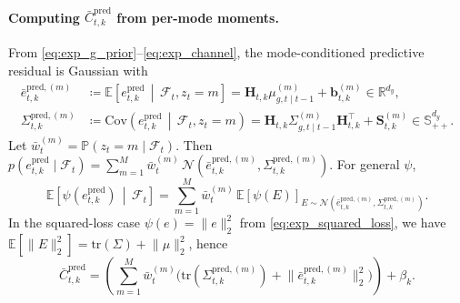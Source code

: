 \paragraph{Computing \(\bar C_{t,k}^{\mathrm{pred}}\) from per-mode moments.}
From \eqref{eq:exp_g_prior}--\eqref{eq:exp_channel}, the mode-conditioned predictive residual is Gaussian with
\begin{align}
\label{eq:exp_residual_mean}
\bar e_{t,k}^{\mathrm{pred},(m)}
&\coloneqq
\mathbb{E}\!\left[e_{t,k}^{\mathrm{pred}}\,\middle|\,\mathcal{F}_t,z_t=m\right]
=
\mathbf{H}_{t,k}\mu^{(m)}_{g,t\mid t-1}+\mathbf{b}^{(m)}_{t,k}\in\mathbb{R}^{d_y},\\
\label{eq:exp_residual_var}
\Sigma_{t,k}^{\mathrm{pred},(m)}
&\coloneqq
\mathrm{Cov}\!\left(e_{t,k}^{\mathrm{pred}}\,\middle|\,\mathcal{F}_t,z_t=m\right)
=
\mathbf{H}_{t,k}\Sigma^{(m)}_{g,t\mid t-1}\mathbf{H}_{t,k}^\top+\mathbf{S}^{(m)}_{t,k}\in\mathbb{S}^{d_y}_{++}.
\end{align}
Let \(\bar{w}_t^{(m)}=\mathbb{P}(z_t=m\mid\mathcal{F}_t)\).
Then \(p(e_{t,k}^{\mathrm{pred}}\mid\mathcal{F}_t)=\sum_{m=1}^M \bar{w}_t^{(m)}\,\mathcal{N}(\bar e_{t,k}^{\mathrm{pred},(m)},\Sigma_{t,k}^{\mathrm{pred},(m)})\).
For general \(\psi\),
\begin{equation}
\label{eq:exp_cost_mix}
\mathbb{E}\!\left[\psi(e_{t,k}^{\mathrm{pred}})\,\middle|\,\mathcal{F}_t\right]
=
\sum_{m=1}^M \bar{w}_t^{(m)}\,
\mathbb{E}\!\left[\psi(E)\right]_{E\sim\mathcal{N}(\bar e_{t,k}^{\mathrm{pred},(m)},\Sigma_{t,k}^{\mathrm{pred},(m)})}.
\end{equation}
In the squared-loss case \(\psi(e)=\lVert e\rVert_2^2\) from \eqref{eq:exp_squared_loss}, we have
\(\mathbb{E}[\lVert E\rVert_2^2]=\mathrm{tr}(\Sigma)+\lVert \mu\rVert_2^2\), hence
\begin{equation}
\label{eq:exp_square_loss_mix}
\bar C_{t,k}^{\mathrm{pred}}
=
\left(\sum_{m=1}^M \bar{w}_t^{(m)}\big(\mathrm{tr}(\Sigma_{t,k}^{\mathrm{pred},(m)})+\lVert \bar e_{t,k}^{\mathrm{pred},(m)}\rVert_2^2\big)\right)+\beta_k.
\end{equation}

